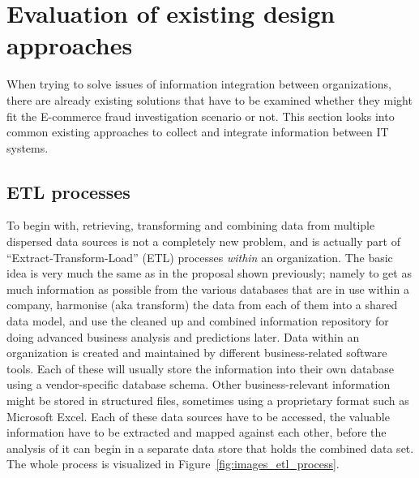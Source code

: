
\section{Evaluation of existing design approaches}
\label{sec:system_approaches}

When trying to solve issues of information integration between organizations, there are already existing solutions that have to be examined whether they might fit the \gls{E-commerce} fraud investigation scenario or not. This section looks into common existing approaches to collect and integrate information between \gls{IT} systems.

\subsection{\gls{ETL} processes}
\label{subsec:etl_process}

To begin with, retrieving, transforming and combining data from multiple dispersed data sources is not a completely new problem, and is actually part of ``Extract-Transform-Load'' (\gls{ETL}) processes \emph{within} an organization. The basic idea is very much the same as in the proposal shown previously; namely to get as much information as possible from the various databases that are in use within a company, harmonise (aka transform) the data from each of them into a shared data model, and use the cleaned up and combined information repository for doing advanced business analysis and predictions later. Data within an organization is created and maintained by different business-related software tools. Each of these will usually store the information into their own database using a vendor-specific database schema. Other business-relevant information might be stored in structured files, sometimes using a proprietary format such as Microsoft Excel. Each of these data sources have to be accessed, the valuable information have to be extracted and mapped against each other, before the analysis of it can begin in a separate data store that holds the combined data set. The whole process is visualized in Figure~\ref{fig:images_etl_process}. \@

